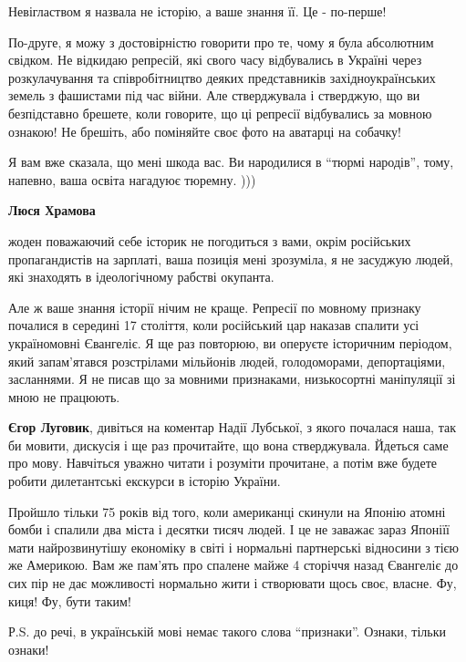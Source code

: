 \begin{itemize}
\begin{itemize}
Невіглаством я назвала не історію, а
ваше знання її. Це - по-перше! 

По-друге, я можу з достовірністю говорити про
те, чому я була абсолютним свідком. Не відкидаю репресій, які свого часу
відбувались в Україні через розкулачування та співробітництво деяких
представників західноукраїнських земель з фашистами під час війни. Але
стверджувала і стверджую, що ви безпідставно брешете, коли говорите, що ці
репресії відбувались за мовною ознакою! Не брешіть, або поміняйте своє фото на
аватарці на собачку!

Я вам вже сказала, що мені шкода вас. Ви народилися в \enquote{тюрмі народів},
тому, напевно, ваша освіта нагадуює тюремну. )))

\textbf{Люся Храмова} 

жоден поважаючий себе історик не погодиться з вами, окрім російських пропагандистів на зарплаті, ваша позиція мені зрозуміла, я не засуджую людей, які знаходять в ідеологічному рабстві окупанта. 

Але ж ваше знання історії нічим не краще. Репресії по мовному признаку почалися
в середині 17 століття, коли російський цар наказав спалити усі україномовні
Євангеліє. Я ще раз повторюю, ви оперуєте історичним періодом, який
запам'ятався розстрілами мільйонів людей, голодоморами, депортаціями,
засланнями. Я не писав що за мовними признаками, низькосортні маніпуляції зі
мною не працюють.



\textbf{Єгор Луговик}, дивіться на коментар Надії Лубської, з якого почалася наша, так
би мовити, дискусія і ще раз прочитайте, що вона стверджувала. Йдеться саме про
мову. Навчіться уважно читати і розуміти прочитане, а потім вже будете робити
дилетантські екскурси в історію України. 

Пройшло тільки 75 років від того, коли
американці скинули на Японію атомні бомби і спалили два міста і десятки тисяч
людей. І це не заважає зараз Японіїї мати найрозвинутішу економіку в світі і
нормальні партнерські відносини з тією же Америкою. Вам же пам'ять про спалене
майже 4 сторіччя назад Євангеліє до сих пір не дає можливості нормально жити і
створювати щось своє, власне. Фу, киця! Фу, бути таким!

Р.S. до речі, в українській мові немає такого слова \enquote{признаки}. Ознаки, тільки ознаки!


\end{itemize}
\end{itemize}
